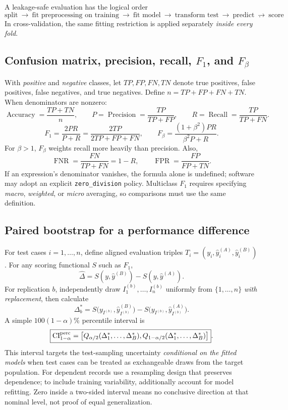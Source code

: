A leakage-safe evaluation has the logical order
\[
\boxed{\text{split} \ \to\ \text{fit preprocessing on training}
\ \to\ \text{fit model}\ \to\ \text{transform test}\ \to\ \text{predict}\ \to\ \text{score}}.
\]
In cross-validation, the same fitting restriction is applied separately \emph{inside every fold}.

\subsection{Confusion matrix, precision, recall, $F_1$, and $F_\beta$}
With \emph{positive} and \emph{negative} classes, let $TP,FP,FN,TN$ denote true positives, false positives, false negatives, and true negatives. Define $n=TP+FP+FN+TN$. When denominators are nonzero:
\[
\boxed{\operatorname{Accuracy}=\frac{TP+TN}{n}},\qquad
\boxed{P=\operatorname{Precision}=\frac{TP}{TP+FP}},\qquad
\boxed{R=\operatorname{Recall}=\frac{TP}{TP+FN}}.
\]
\[
\boxed{F_1=\frac{2PR}{P+R}=\frac{2TP}{2TP+FP+FN}},\qquad
\boxed{F_\beta=\frac{(1+\beta^2)PR}{\beta^2P+R}}.
\]
For $\beta>1$, $F_\beta$ weights recall more heavily than precision. Also,
\[
\boxed{\operatorname{FNR}=\frac{FN}{TP+FN}=1-R},\qquad
\boxed{\operatorname{FPR}=\frac{FP}{FP+TN}}.
\]
If an expression's denominator vanishes, the formula alone is undefined; software may adopt an explicit \texttt{zero\_division} policy. Multiclass $F_1$ requires specifying \emph{macro}, \emph{weighted}, or \emph{micro} averaging, so comparisons must use the same definition.

\subsection{Paired bootstrap for a performance difference}
For test cases $i=1,\ldots,n$, define aligned evaluation triples $T_i=(y_i,\hat y_i^{(A)},\hat y_i^{(B)})$. For any scoring functional $S$ such as $F_1$,
\[
\boxed{\hat\Delta=S(y,\hat y^{(B)})-S(y,\hat y^{(A)})}.
\]
For replication $b$, independently draw $I_1^{(b)},\ldots,I_n^{(b)}$ uniformly from $\{1,\ldots,n\}$ \emph{with replacement}, then calculate
\[
\boxed{\Delta_b^*=S\big(y_{I^{(b)}},\hat y^{(B)}_{I^{(b)}}\big)
-S\big(y_{I^{(b)}},\hat y^{(A)}_{I^{(b)}}\big)}.
\]
A simple $100(1-\alpha)\%$ percentile interval is
\[
\boxed{\mathrm{CI}_{1-\alpha}^{\rm perc}
=\left[Q_{\alpha/2}(\Delta_1^*,\ldots,\Delta_B^*),
Q_{1-\alpha/2}(\Delta_1^*,\ldots,\Delta_B^*)\right]}.
\]
This interval targets the test-sampling uncertainty \emph{conditional on the fitted models} when test cases can be treated as exchangeable draws from the target population. For dependent records use a resampling design that preserves dependence; to include training variability, additionally account for model refitting. Zero inside a two-sided interval means no conclusive direction at that nominal level, not proof of equal generalization.

